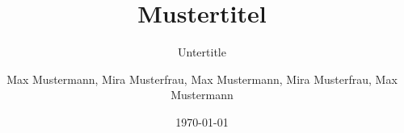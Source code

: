 \author{
	Max Mustermann,
	Mira Musterfrau,
	Max Mustermann,
	Mira Musterfrau,
	Max Mustermann
}
\titlehead{Fachbereich}
\subject{Grund der Arbeit}
\title{Mustertitel}
\subtitle{Untertitle}
\date{\today}
